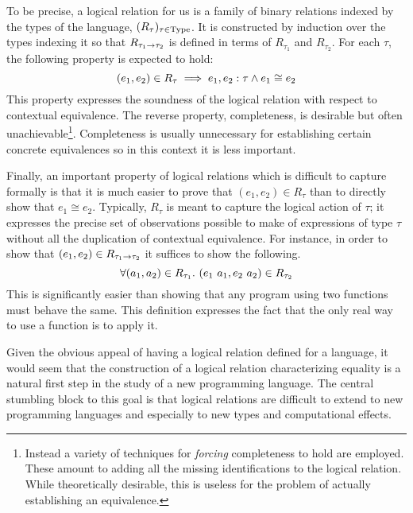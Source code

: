 To be precise, a logical relation for us is a family of binary
relations indexed by the types of the language,
$(R_\tau)_{\tau \in \mathrm{Type}}$. It is constructed by induction over the
types indexing it so that $R_{\tau_1 \to \tau_2}$ is defined in
terms of $R_{\tau_1}$ and $R_{\tau_2}$. For each $\tau$, the following
property is expected to hold:
\[
  (e_1, e_2) \in R_\tau \implies
  e_1, e_2 \mathrel{:} \tau \land e_1 \cong e_2
\]
This property expresses the soundness of the logical relation with
respect to contextual equivalence. The reverse property, completeness,
is desirable but often unachievable\footnote{Instead a variety of
  techniques for \emph{forcing} completeness to hold are
  employed. These amount to adding all the missing identifications to
  the logical relation. While theoretically desirable, this is useless
  for the problem of actually establishing an
  equivalence.}. Completeness is usually unnecessary for establishing
certain concrete equivalences so in this context it is less
important.

Finally, an important property of logical relations which is difficult
to capture formally is that it is much easier to prove that
$(e_1, e_2) \in R_\tau$ than to directly show that $e_1 \cong e_2$.
Typically, $R_\tau$ is meant to capture the logical action of $\tau$;
it expresses the precise set of observations possible to make of
expressions of type $\tau$ without all the duplication of contextual
equivalence. For instance, in order to show that
$(e_1, e_2) \in R_{\tau_1 \to \tau_2}$ it suffices to show the
following.
\[
  \forall (a_1, a_2) \in R_{\tau_1}.
  \ (e_1\ a_1, e_2\ a_2) \in R_{\tau_2}
\]
This is significantly easier than showing that any program using two
functions must behave the same. This definition expresses the fact
that the only real way to use a function is to apply it.

Given the obvious appeal of having a logical relation defined for a
language, it would seem that the construction of a logical relation
characterizing equality is a natural first step in the study of a new
programming language. The central stumbling block to this goal is that
logical relations are difficult to extend to new programming languages
and especially to new types and computational effects.

